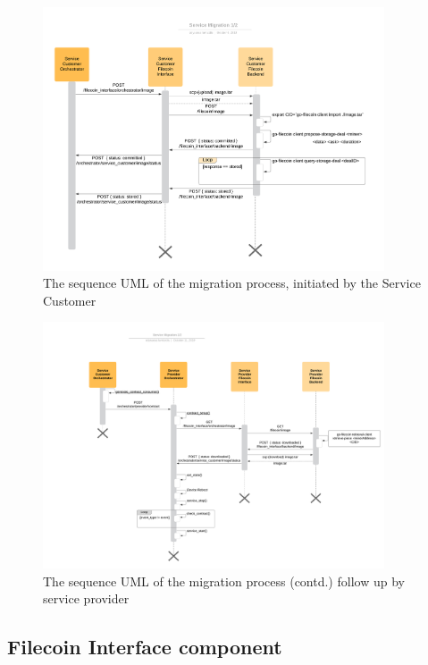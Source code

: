 \clearpage
\begin{figure}
    \centering
    \includegraphics[width=0.9\textwidth]{images/service_mig_1.png}
    \caption{The sequence UML of the migration process, initiated by the Service Customer}
    \label{fig:service_mig_1}
\end{figure}

\begin{figure}
    \centering
    \includegraphics[width=0.9\textwidth]{images/service_mig_2.png}
    \caption{The sequence UML of the migration process (contd.) follow up by service provider}
    \label{fig:service_mig_2}
\end{figure}

\clearpage
\subsection{Filecoin Interface component}


